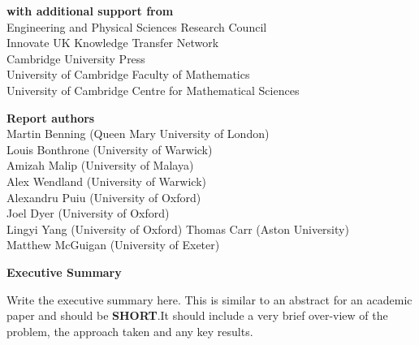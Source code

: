 \documentclass[12pt]{article}
\begin{document}
\begin{center}
\textbf{with additional support from}\\
Engineering and Physical Sciences Research Council\\
Innovate UK Knowledge Transfer Network\\
Cambridge University Press\\
University of Cambridge Faculty of Mathematics\\
University of Cambridge Centre for Mathematical Sciences
\end{center}
\newpage
\begin{center}
    \large\textbf{Report authors}\\ %
   \vskip1cm
    \normalsize Martin Benning (Queen Mary University of London) \\
    \normalsize Louis Bonthrone (University of Warwick)\\
    \normalsize Amizah Malip (University of Malaya)\\
    \normalsize Alex Wendland (University of Warwick)\\
    \normalsize Alexandru Puiu (University of Oxford)\\
    \normalsize Joel Dyer (University of Oxford)\\
    \normalsize Lingyi Yang (University of Oxford)
    \normalsize Thomas Carr (Aston University)\\
    \normalsize Matthew McGuigan (University of Exeter)
\end{center}
\vskip2cm
\begin{center}
    \textbf{Executive Summary}
\end{center}
Write the executive summary here. This is similar to an abstract for an academic paper and should be \textbf{SHORT}.It should include a very brief over-view of the problem, the approach taken and any key results.
\newpage
\end{document}
